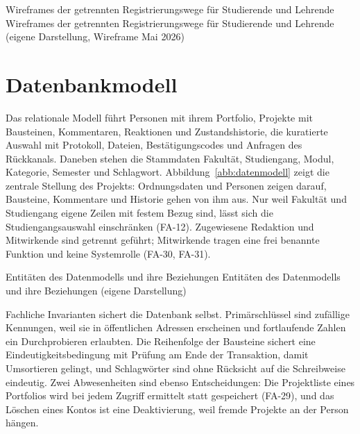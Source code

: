 %
{Wireframes der getrennten Registrierungswege für Studierende und Lehrende}%
{Wireframes der getrennten Registrierungswege für Studierende und Lehrende (eigene Darstellung, Wireframe Mai 2026)}

\section{Datenbankmodell}
\label{sec:datenmodell}

Das relationale Modell führt Personen mit ihrem Portfolio, Projekte mit Bausteinen, Kommentaren, Reaktionen und Zustandshistorie, die kuratierte Auswahl mit Protokoll, Dateien, Bestätigungscodes und Anfragen des Rückkanals. Daneben stehen die Stammdaten Fakultät, Studiengang, Modul, Kategorie, Semester und Schlagwort. Abbildung~\ref{abb:datenmodell} zeigt die zentrale Stellung des Projekts: Ordnungsdaten und Personen zeigen darauf, Bausteine, Kommentare und Historie gehen von ihm aus. Nur weil Fakultät und Studiengang eigene Zeilen mit festem Bezug sind, lässt sich die Studiengangsauswahl einschränken (FA-12). Zugewiesene Redaktion und Mitwirkende sind getrennt geführt; Mitwirkende tragen eine frei benannte Funktion und keine Systemrolle (FA-30, FA-31).

%
{Entitäten des Datenmodells und ihre Beziehungen}%
{Entitäten des Datenmodells und ihre Beziehungen (eigene Darstellung)}

Fachliche Invarianten sichert die Datenbank selbst. Primärschlüssel sind zufällige Kennungen, weil sie in öffentlichen Adressen erscheinen und fortlaufende Zahlen ein Durchprobieren erlaubten. Die Reihenfolge der Bausteine sichert eine Eindeutigkeitsbedingung mit Prüfung am Ende der Transaktion, damit Umsortieren gelingt, und Schlagwörter sind ohne Rücksicht auf die Schreibweise eindeutig. Zwei Abwesenheiten sind ebenso Entscheidungen: Die Projektliste eines Portfolios wird bei jedem Zugriff ermittelt statt gespeichert (FA-29), und das Löschen eines Kontos ist eine Deaktivierung, weil fremde Projekte an der Person hängen.
